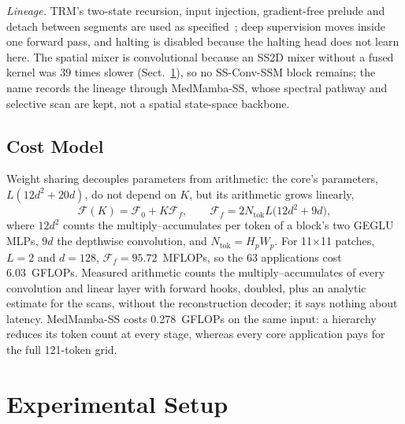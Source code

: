 \documentclass{svproc}
\begin{document}
\emph{Lineage.} TRM's two-state recursion, input injection, gradient-free prelude and detach between segments are used as specified~\cite{trm}; deep supervision moves inside one forward pass, and halting is disabled because the halting head does not learn here. The spatial mixer is convolutional because an SS2D mixer without a fused kernel was 39 times slower (Sect.~\ref{sec:setup}), so no SS-Conv-SSM block remains; the name records the lineage through MedMamba-SS, whose spectral pathway and selective scan are kept, not a spatial state-space backbone.

\subsection{Cost Model}\label{sec:cost}
Weight sharing decouples parameters from arithmetic: the core's parameters, $L(12d^2 + 20d)$, do not depend on $K$, but its arithmetic grows linearly,
\begin{equation}
\mathcal{F}(K) = \mathcal{F}_0 + K \mathcal{F}_f, \qquad \mathcal{F}_f = 2 N_{\text{tok}} L \big(12 d^2 + 9 d\big),
\label{eq:cost}
\end{equation}
where $12d^2$ counts the multiply--accumulates per token of a block's two GEGLU MLPs, $9d$ the depthwise convolution, and $N_{\text{tok}} = H_p W_p$. For 11$\times$11 patches, $L = 2$ and $d = 128$, $\mathcal{F}_f = 95.72$~MFLOPs, so the 63 applications cost 6.03~GFLOPs. Measured arithmetic counts the multiply--accumulates of every convolution and linear layer with forward hooks, doubled, plus an analytic estimate for the scans, without the reconstruction decoder; it says nothing about latency. MedMamba-SS costs 0.278~GFLOPs on the same input: a hierarchy reduces its token count at every stage, whereas every core application pays for the full 121-token grid.

\section{Experimental Setup}\label{sec:setup}
\end{document}
